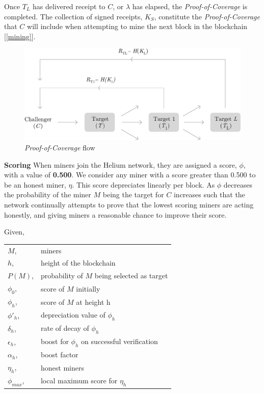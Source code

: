 \documentclass[letterpaper,11pt]{article}
\begin{document}
Once $T_L$ has delivered receipt to $C$, or $\lambda$ has elapsed, the \emph{Proof-of-Coverage} is completed. The collection of signed receipts, $K_S$, constitute the \emph{Proof-of-Coverage} that $C$ will include when attempting to mine the next block in the blockchain [\ref{mining}].

\begin{figure}[H]
    \begin{center}
          \includegraphics[width=\textwidth]{diagram4.eps}
          \caption{\emph{Proof-of-Coverage} flow}
          \label{fig:poc-flow}
     \end{center}
\end{figure}

\textbf{Scoring} \label{scores} When miners join the Helium network, they are assigned a score, $\phi$, with a value of \textbf{0.500}. We consider any miner with a score greater than 0.500 to be an honest miner, $\eta$. This score depreciates linearly per block. As $\phi$ decreases the probability of the miner $M$ being the target for $C$ increases such that the network continually attempts to prove that the lowest scoring miners are acting honestly, and giving miners a reasonable chance to improve their score.

Given,\newline
\begin{tabular}{l l}
	$M$,       	  & miners                                         \\
	$h$,          & height of the blockchain                       \\
	$P(M)$,       & probability of $M$ being selected as target    \\
	$\phi_0$,     & score of $M$ initially                         \\
	$\phi_h$,     & score of $M$ at height h                       \\
	$\phi'_h$,    & depreciation value of $\phi_h$                 \\
	$\delta_h$,   & rate of decay of $\phi_h$                      \\
	$\epsilon_h$, & boost for $\phi_h$ on successful verification  \\
	$\alpha_h$,   & boost factor                                   \\
	$\eta_h$,     & honest miners                                  \\
	$\phi_{max}$, & local maximum score for $\eta_h$               \\
\end{tabular}
\end{document}
